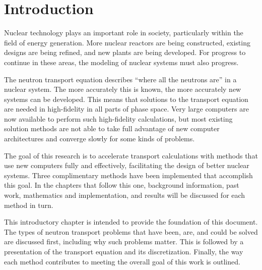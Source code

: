 
\chapter{Introduction}
\label{sec:Chp1}

Nuclear technology plays an important role in society, particularly within the field of energy generation. More nuclear reactors are being constructed, existing designs are being refined, and new plants are being developed. For progress to continue in these areas, the modeling of nuclear systems must also progress. 

The neutron transport equation describes ``where all the neutrons are'' in a nuclear system. The more accurately this is known, the more accurately new systems can be developed. This means that solutions to the transport equation are needed in high-fidelity in all parts of phase space. Very large computers are now available to perform such high-fidelity calculations, but most existing solution methods are not able to take full advantage of new computer architectures and converge slowly for some kinds of problems.  

The goal of this research is to accelerate transport calculations with methods that use new computers fully and effectively, facilitating the design of better nuclear systems. Three complimentary methods have been implemented that accomplish this goal. In the chapters that follow this one, background information, past work, mathematics and implementation, and results will be discussed for each method in turn. 

This introductory chapter is intended to provide the foundation of this document. The types of neutron transport problems that have been, are, and could be solved are discussed first, including why such problems matter. This is followed by a presentation of the transport equation and its discretization. Finally, the way each method contributes to meeting the overall goal of this work is outlined. 

